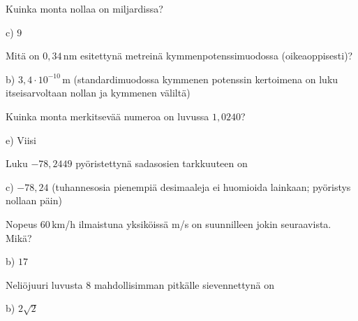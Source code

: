 \begin{tehtava}
Kuinka monta nollaa on miljardissa?
\begin{vastaus}
c) $9$
\end{vastaus}
\end{tehtava}

\begin{tehtava}
Mitä on $0,34$\,nm esitettynä metreinä kymmenpotenssimuodossa (oikeaoppisesti)?
\begin{vastaus}
b) $3,4 \cdot 10^{-10}$\,m (standardimuodossa kymmenen potenssin kertoimena on luku itseisarvoltaan nollan ja kymmenen väliltä)
\end{vastaus}
\end{tehtava}

\begin{tehtava}
Kuinka monta merkitsevää numeroa on luvussa $1,0240$?
\begin{vastaus}
e) Viisi
\end{vastaus}
\end{tehtava}

\begin{tehtava}
Luku $-78,2449$ pyöristettynä sadasosien tarkkuuteen on
\begin{vastaus}
c) $-78,24$ (tuhannesosia pienempiä desimaaleja ei huomioida lainkaan; pyöristys nollaan päin)
\end{vastaus}
\end{tehtava}


\begin{tehtava}
Nopeus $60$\,km/h ilmaistuna yksiköissä m/s on suunnilleen jokin seuraavista. Mikä?
	\begin{vastaus}
	 b) $17$
	\end{vastaus}
\end{tehtava}

\begin{tehtava}
Neliöjuuri luvusta $8$ mahdollisimman pitkälle sievennettynä on

  \begin{vastaus}
	 b) $2\sqrt{2}$
    \end{vastaus}
\end{tehtava}

